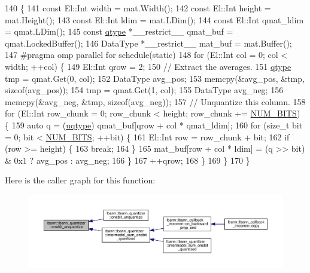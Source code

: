 \begin{DoxyCode}
140                                                                              \{
141   \textcolor{keyword}{const} El::Int width = mat.Width();
142   \textcolor{keyword}{const} El::Int height = mat.Height();
143   \textcolor{keyword}{const} El::Int ldim = mat.LDim();
144   \textcolor{keyword}{const} El::Int qmat\_ldim = qmat.LDim();
145   \textcolor{keyword}{const} \hyperlink{classlbann_1_1lbann__quantizer_afcda642ff1b44d31eec910909c3d013e}{qtype} *\_\_restrict\_\_ qmat\_buf = qmat.LockedBuffer();
146   DataType *\_\_restrict\_\_ mat\_buf = mat.Buffer();
147 \textcolor{preprocessor}{  #pragma omp parallel for schedule(static)}
148   \textcolor{keywordflow}{for} (El::Int col = 0; col < width; ++col) \{
149     El::Int qrow = 2;
150     \textcolor{comment}{// Extract the averages.}
151     \hyperlink{classlbann_1_1lbann__quantizer_afcda642ff1b44d31eec910909c3d013e}{qtype} tmp = qmat.Get(0, col);
152     DataType avg\_pos;
153     memcpy(&avg\_pos, &tmp, \textcolor{keyword}{sizeof}(avg\_pos));
154     tmp = qmat.Get(1, col);
155     DataType avg\_neg;
156     memcpy(&avg\_neg, &tmp, \textcolor{keyword}{sizeof}(avg\_neg));
157     \textcolor{comment}{// Unquantize this column.}
158     \textcolor{keywordflow}{for} (El::Int row\_chunk = 0; row\_chunk < height; row\_chunk += \hyperlink{classlbann_1_1lbann__quantizer_a33ea17392f53b90e91aea1ffb7e11d68}{NUM\_BITS}) \{
159       \textcolor{keyword}{auto} q = (\hyperlink{classlbann_1_1lbann__quantizer_ac8b63c86fc871e248ce20c7af19a7fad}{uqtype}) qmat\_buf[qrow + col * qmat\_ldim];
160       \textcolor{keywordflow}{for} (\textcolor{keywordtype}{size\_t} bit = 0; bit < \hyperlink{classlbann_1_1lbann__quantizer_a33ea17392f53b90e91aea1ffb7e11d68}{NUM\_BITS}; ++bit) \{
161         El::Int row = row\_chunk + bit;
162         \textcolor{keywordflow}{if} (row >= height) \{
163           \textcolor{keywordflow}{break};
164         \}
165         mat\_buf[row + col * ldim] = (q >> bit) & 0x1 ? avg\_pos : avg\_neg;
166       \}
167       ++qrow;
168     \}
169   \}
170 \}
\end{DoxyCode}
Here is the caller graph for this function\+:\nopagebreak
\begin{figure}[H]
\begin{center}
\leavevmode
\includegraphics[width=350pt]{classlbann_1_1lbann__quantizer_ad5592daa122b40c275cce3dc93bba41e_icgraph}
\end{center}
\end{figure}
\mbox{\label{classlbann_1_1lbann__quantizer_afc7a47fb5a5e87a09f2913a46a2bacf7}} 
